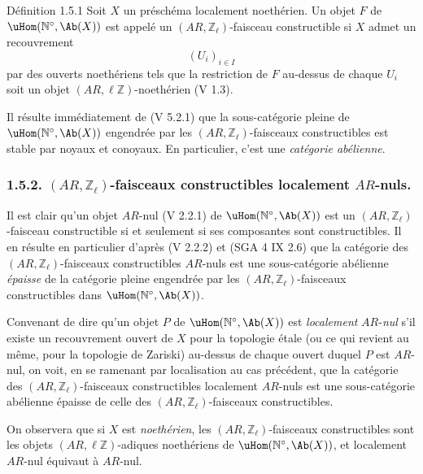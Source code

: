 \begin{statement}{Définition 1.5.1}
Soit \(X\) un préschéma localement noethérien. Un objet \(F\) de \(\uHom(\mathbb{N}^\circ,\Ab(X))\) est appelé un \((AR,\mathbb{Z}_\ell)\)-faisceau constructible si \(X\) admet un recouvrement
\[
(U_i)_{i\in I}
\]
par des
ouverts noethériens tels que la restriction de \(F\) au-dessus de chaque \(U_i\) soit un objet \((AR,\ell\mathbb{Z})\)-noethérien (V 1.3).
\end{statement}

Il résulte immédiatement de (V 5.2.1) que la sous-catégorie pleine de \(\uHom(\mathbb{N}^\circ,\Ab(X))\) engendrée par les \((AR,\mathbb{Z}_\ell)\)-faisceaux constructibles est stable par noyaux et conoyaux. En particulier, c'est une \emph{catégorie abélienne}.

\subsubsection*{1.5.2. \((AR,\mathbb{Z}_\ell)\)-faisceaux constructibles localement \(AR\)-nuls.}

Il est clair qu'un objet \(AR\)-nul (V 2.2.1) de \(\uHom(\mathbb{N}^\circ,\Ab(X))\) est un \((AR,\mathbb{Z}_\ell)\)-faisceau constructible si et seulement si ses composantes sont constructibles. Il en résulte en particulier d'après (V 2.2.2) et (SGA 4 IX 2.6) que la catégorie des \((AR,\mathbb{Z}_\ell)\)-faisceaux constructibles \(AR\)-nuls est une sous-catégorie abélienne \emph{épaisse} de la catégorie pleine engendrée par les \((AR,\mathbb{Z}_\ell)\)-faisceaux constructibles dans \(\uHom(\mathbb{N}^\circ,\Ab(X))\).

Convenant de dire qu'un objet \(P\) de \(\uHom(\mathbb{N}^\circ,\Ab(X))\) est \emph{localement} \(AR\)-\emph{nul} s'il existe un recouvrement ouvert de \(X\) pour la topologie étale (ou ce qui revient au même, pour la topologie de Zariski) au-dessus de chaque ouvert duquel \(P\) est \(AR\)-nul, on voit, en se ramenant par localisation au cas précédent, que la catégorie des \((AR,\mathbb{Z}_\ell)\)-faisceaux constructibles localement \(AR\)-nuls est une sous-catégorie abélienne épaisse de celle des \((AR,\mathbb{Z}_\ell)\)-faisceaux constructibles.

On observera que si \(X\) est \emph{noethérien}, les \((AR,\mathbb{Z}_\ell)\)-faisceaux constructibles sont les objets \((AR,\ell\mathbb{Z})\)-adiques noethériens de \(\uHom(\mathbb{N}^\circ,\Ab(X))\), et localement \(AR\)-nul équivaut à \(AR\)-nul.

